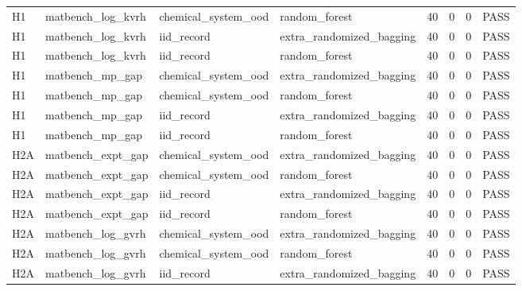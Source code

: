 \documentclass[10pt]{article}
\begin{document}
\begin{landscape}
\begin{longtable}{L{.32in}L{1.05in}L{1.2in}L{1.3in}L{.42in}L{.42in}L{.42in}L{.48in}}
H1 & matbench\_\allowbreak{}log\_\allowbreak{}kvrh & chemical\_\allowbreak{}system\_\allowbreak{}ood & random\_\allowbreak{}forest & 40 & 0 & 0 & PASS\\
H1 & matbench\_\allowbreak{}log\_\allowbreak{}kvrh & iid\_\allowbreak{}record & extra\_\allowbreak{}randomized\_\allowbreak{}bagging & 40 & 0 & 0 & PASS\\
H1 & matbench\_\allowbreak{}log\_\allowbreak{}kvrh & iid\_\allowbreak{}record & random\_\allowbreak{}forest & 40 & 0 & 0 & PASS\\
H1 & matbench\_\allowbreak{}mp\_\allowbreak{}gap & chemical\_\allowbreak{}system\_\allowbreak{}ood & extra\_\allowbreak{}randomized\_\allowbreak{}bagging & 40 & 0 & 0 & PASS\\
H1 & matbench\_\allowbreak{}mp\_\allowbreak{}gap & chemical\_\allowbreak{}system\_\allowbreak{}ood & random\_\allowbreak{}forest & 40 & 0 & 0 & PASS\\
H1 & matbench\_\allowbreak{}mp\_\allowbreak{}gap & iid\_\allowbreak{}record & extra\_\allowbreak{}randomized\_\allowbreak{}bagging & 40 & 0 & 0 & PASS\\
H1 & matbench\_\allowbreak{}mp\_\allowbreak{}gap & iid\_\allowbreak{}record & random\_\allowbreak{}forest & 40 & 0 & 0 & PASS\\
H2A & matbench\_\allowbreak{}expt\_\allowbreak{}gap & chemical\_\allowbreak{}system\_\allowbreak{}ood & extra\_\allowbreak{}randomized\_\allowbreak{}bagging & 40 & 0 & 0 & PASS\\
H2A & matbench\_\allowbreak{}expt\_\allowbreak{}gap & chemical\_\allowbreak{}system\_\allowbreak{}ood & random\_\allowbreak{}forest & 40 & 0 & 0 & PASS\\
H2A & matbench\_\allowbreak{}expt\_\allowbreak{}gap & iid\_\allowbreak{}record & extra\_\allowbreak{}randomized\_\allowbreak{}bagging & 40 & 0 & 0 & PASS\\
H2A & matbench\_\allowbreak{}expt\_\allowbreak{}gap & iid\_\allowbreak{}record & random\_\allowbreak{}forest & 40 & 0 & 0 & PASS\\
H2A & matbench\_\allowbreak{}log\_\allowbreak{}gvrh & chemical\_\allowbreak{}system\_\allowbreak{}ood & extra\_\allowbreak{}randomized\_\allowbreak{}bagging & 40 & 0 & 0 & PASS\\
H2A & matbench\_\allowbreak{}log\_\allowbreak{}gvrh & chemical\_\allowbreak{}system\_\allowbreak{}ood & random\_\allowbreak{}forest & 40 & 0 & 0 & PASS\\
H2A & matbench\_\allowbreak{}log\_\allowbreak{}gvrh & iid\_\allowbreak{}record & extra\_\allowbreak{}randomized\_\allowbreak{}bagging & 40 & 0 & 0 & PASS\\

\end{longtable}
\end{landscape}
\end{document}
